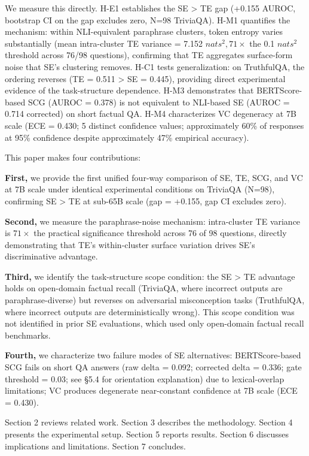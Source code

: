 We measure this directly. H-E1 establishes the SE > TE gap (+0.155 AUROC, bootstrap CI on the gap excludes zero, N=98 TriviaQA). H-M1 quantifies the mechanism: within NLI-equivalent paraphrase clusters, token entropy varies substantially (mean intra-cluster TE variance = 7.152 $nats^2, 71\times$ the 0.1 $nats^2$ threshold across 76/98 questions), confirming that TE aggregates surface-form noise that SE's clustering removes. H-C1 tests generalization: on TruthfulQA, the ordering reverses (TE = 0.511 > SE = 0.445), providing direct experimental evidence of the task-structure dependence. H-M3 demonstrates that BERTScore-based SCG (AUROC = 0.378) is not equivalent to NLI-based SE (AUROC = 0.714 corrected) on short factual QA. H-M4 characterizes VC degeneracy at 7B scale (ECE = 0.430; 5 distinct confidence values; approximately 60\% of responses at 95\% confidence despite approximately 47\% empirical accuracy).

This paper makes four contributions:

\textbf{First,} we provide the first unified four-way comparison of SE, TE, SCG, and VC at 7B scale under identical experimental conditions on TriviaQA (N=98), confirming SE > TE at sub-65B scale (gap = +0.155, gap CI excludes zero).

\textbf{Second,} we measure the paraphrase-noise mechanism: intra-cluster TE variance is $71\times$ the practical significance threshold across 76 of 98 questions, directly demonstrating that TE's within-cluster surface variation drives SE's discriminative advantage.

\textbf{Third,} we identify the task-structure scope condition: the SE > TE advantage holds on open-domain factual recall (TriviaQA, where incorrect outputs are paraphrase-diverse) but reverses on adversarial misconception tasks (TruthfulQA, where incorrect outputs are deterministically wrong). This scope condition was not identified in prior SE evaluations, which used only open-domain factual recall benchmarks.

\textbf{Fourth,} we characterize two failure modes of SE alternatives: BERTScore-based SCG fails on short QA answers (raw delta = 0.092; corrected delta = 0.336; gate threshold = 0.03; see §5.4 for orientation explanation) due to lexical-overlap limitations; VC produces degenerate near-constant confidence at 7B scale (ECE = 0.430).

Section 2 reviews related work. Section 3 describes the methodology. Section 4 presents the experimental setup. Section 5 reports results. Section 6 discusses implications and limitations. Section 7 concludes.

